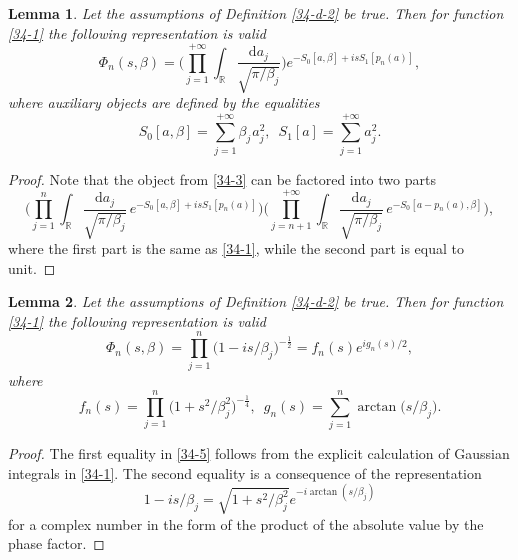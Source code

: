 \documentclass[a4paper]{article}
\newtheorem{lemma}{Lemma}
\begin{document}
\begin{lemma}\label{34-l-3}
Let the assumptions of Definition \ref{34-d-2} be true. Then for function \eqref{34-1} the following representation is valid
\begin{equation}\label{34-3}
	\Phi_n(s,\beta)=
	\Bigg(\prod_{j=1}^{+\infty}\int_{\mathbb{R}}\frac{\mathrm{d}a_j}{\sqrt{\pi/\beta_j}}\Bigg)
	e^{-S_0[a,\beta]+isS_1[p_n(a)]},
\end{equation}
where auxiliary objects are defined by the equalities
\begin{equation}\label{34-2}
	S_0[a,\beta]=\sum_{j=1}^{+\infty}\beta_j^{\phantom{1}}a_j^2,\,\,\,
	S_1[a]=\sum_{j=1}^{+\infty}a_j^2.
\end{equation}
\end{lemma}
\begin{proof} Note that the object from \eqref{34-3} can be factored into two parts
\begin{equation*}
\Bigg(\prod_{j=1}^{n}\int_{\mathbb{R}}\frac{\mathrm{d}a_j}{\sqrt{\pi/\beta_j}}\,
e^{-S_0[a,\beta]+isS_1[p_n(a)]}\Bigg)
\Bigg(\prod_{j=n+1}^{+\infty}\int_{\mathbb{R}}\frac{\mathrm{d}a_j}{\sqrt{\pi/\beta_j}}\,
e^{-S_0[a-p_n(a),\beta]}\Bigg),
\end{equation*}
where the first part is the same as \eqref{34-1}, while the second part is equal to unit.
\end{proof}
\begin{lemma}\label{34-l-1} Let the assumptions of Definition \ref{34-d-2} be true. Then for function \eqref{34-1} the following representation is valid
\begin{equation}\label{34-5}
\Phi_n(s,\beta)=\prod_{j=1}^{n}\Big(1-is/\beta_j\Big)^{-\frac{1}{2}}=
f_n(s)e^{ig_n(s)/2},
\end{equation}
where
\begin{equation}\label{34-6}
f_n(s)=\prod_{j=1}^{n}\Big(1+s^2/\beta_j^2\Big)^{-\frac{1}{4}},\,\,\,
g_n(s)=\sum_{j=1}^n\arctan\big(s/\beta_j\big).
\end{equation}
\end{lemma}
\begin{proof} The first equality in \eqref{34-5} follows from the explicit calculation of Gaussian integrals in \eqref{34-1}. The second equality is a consequence of the representation 
\begin{equation}\label{34-7}
1-is/\beta_j=\sqrt{1+s^2/\beta_j^2}e^{-i\arctan(s/\beta_j)}
\end{equation}
for a complex number in the form of the product of the absolute value by the phase factor.
\end{proof}
\end{document}
